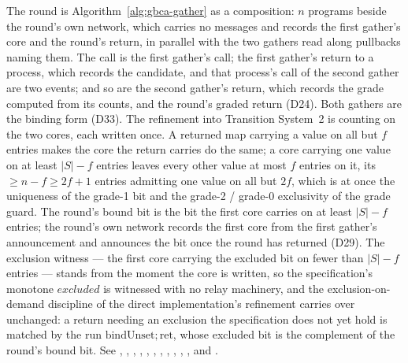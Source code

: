The round is Algorithm~\ref{alg:gbca-gather} as a composition: $n$ programs beside the round's own network, which carries no messages and records the first gather's core and the round's return, in parallel with the two gathers read along pullbacks naming them.
The call is the first gather's call; the first gather's return to a process, which records the candidate, and that process's call of the second gather are two events; and so are the second gather's return, which records the grade computed from its counts, and the round's graded return (D24).
Both gathers are the binding form (D33).
The refinement into Transition System~2 is counting on the two cores, each written once.
A returned map carrying a value on all but $f$ entries makes the core the return carries do the same; a core carrying one value on at least $|S| - f$ entries leaves every other value at most $f$ entries on it, its $\ge n - f \ge 2f + 1$ entries admitting one value on all but $2f$, which is at once the uniqueness of the grade-1 bit and the grade-2 / grade-0 exclusivity of the grade guard.
The round's bound bit is the bit the first core carries on at least $|S| - f$ entries; the round's own network records the first core from the first gather's announcement and announces the bit once the round has returned (D29).
The exclusion witness --- the first core carrying the excluded bit on fewer than $|S| - f$ entries --- stands from the moment the core is written, so the specification's monotone $excluded$ is witnessed with no relay machinery, and the exclusion-on-demand discipline of the direct implementation's refinement carries over unchanged: a return needing an exclusion the specification does not yet hold is matched by the run $\mathrm{bindUnset}; \mathrm{ret}$, whose excluded bit is the complement of the round's bound bit.
See ,
,
,
,
,
,
,
,
,
,
,
 and
.


